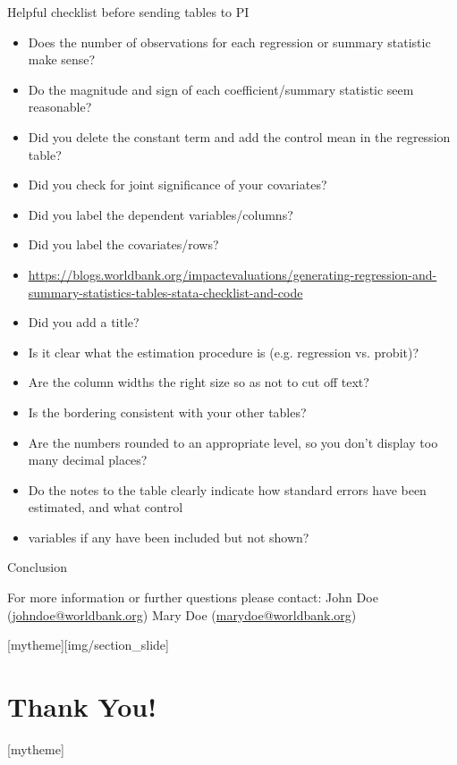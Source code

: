 \documentclass[aspectratio=169]{beamer}
\newcommand{\sectionpic}[2]{
	\setbeamertemplate{section page}[mytheme][#2]
	\section{#1}
	\setbeamertemplate{section page}[mytheme]
}
\begin{document}
\begin{frame}[fragile]{Helpful checklist before sending tables to PI}
\begin{multicols}{2}	
	\begin{itemize}
		\item Does the number of observations for each regression or summary statistic make sense?
		\item Do the magnitude and sign of each coefficient/summary statistic seem reasonable?
		\item Did you delete the constant term and add the control mean in the regression table?
		\item Did you check for joint significance of your covariates?
		\item Did you label the dependent variables/columns?
		\item Did you label the covariates/rows?
		\item \url{https://blogs.worldbank.org/impactevaluations/generating-regression-and-summary-statistics-tables-stata-checklist-and-code}
	\end{itemize}

	\begin{itemize}
		\item Did you add a title?
		\item Is it clear what the estimation procedure is (e.g. regression vs. probit)?
		\item Are the column widths the right size so as not to cut off text?
		\item Is the bordering consistent with your other tables?
		\item Are the numbers rounded to an appropriate level, so you don’t display too many decimal places?
		\item Do the notes to the table clearly indicate how standard errors have been estimated, and what control \item variables if any have been included but not shown?
	\end{itemize}
\end{multicols}
\end{frame}

\begin{frame}{Conclusion}


\vspace{20mm}
For more information or further questions please contact:
\newline John Doe (\url{johndoe@worldbank.org}) \newline Mary Doe (\url{marydoe@worldbank.org})

\end{frame}

\sectionpic{Thank You!}{img/section_slide}
\end{document}
